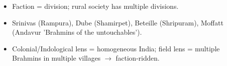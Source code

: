 \begin{QuickRevision}
\begin{itemize}
\item Faction = division; rural society has multiple divisions.
\item Srinivas (Rampura), Dube (Shamirpet), Beteille (Shripuram), Moffatt (Andavur 'Brahmins of the untouchables').
\item Colonial/Indological lens = homogeneous India; field lens = multiple Brahmins in multiple villages $\rightarrow$ faction-ridden.
\end{itemize}
\end{QuickRevision}

